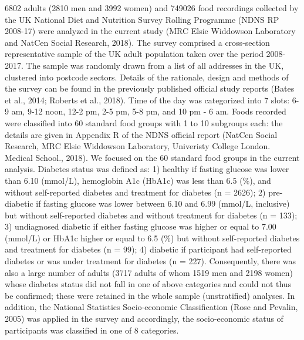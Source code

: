 \documentclass[utf8]{frontiersSCNS}
\begin{document}
6802 adults (2810 men and 3992 women) and 749026 food recordings
collected by the UK National Diet and Nutrition Survey Rolling Programme
(NDNS RP 2008-17) were analyzed in the current study (MRC Elsie
Widdowson Laboratory and NatCen Social Research, 2018). The survey
comprised a cross-section representative sample of the UK adult
population taken over the period 2008-2017. The sample was randomly
drawn from a list of all addresses in the UK, clustered into postcode
sectors. Details of the rationale, design and methods of the survey can
be found in the previously published official study reports (Bates et
al., 2014; Roberts et al., 2018). Time of the day was categorized into 7
slots: 6-9 am, 9-12 noon, 12-2 pm, 2-5 pm, 5-8 pm, and 10 pm - 6 am.
Foods recorded were classified into 60 standard food groups with 1 to 10
subgroups each: the details are given in Appendix R of the NDNS official
report (NatCen Social Research, MRC Elsie Widdowson Laboratory,
Univeristy College London. Medical School., 2018). We focused on the 60
standard food groups in the current analysis. Diabetes status was
defined as: 1) healthy if fasting glucose was lower than 6.10 (mmol/L),
hemoglobin A1c (HbA1c) was less than 6.5 (\%), and without self-reported
diabetes and treatment for diabetes (n = 2626); 2) pre-diabetic if
fasting glucose was lower between 6.10 and 6.99 (mmol/L, inclusive) but
without self-reported diabetes and without treatment for diabetes (n =
133); 3) undiagnosed diabetic if either fasting glucose was higher or
equal to 7.00 (mmol/L) or HbA1c higher or equal to 6.5 (\%) but without
self-reported diabetes and treatment for diabetes (n = 99); 4) diabetic
if participant had self-reported diabetes or was under treatment for
diabetes (n = 227). Consequently, there was also a large number of
adults (3717 adults of whom 1519 men and 2198 women) whose diabetes
status did not fall in one of above categories and could not thus be
confirmed; these were retained in the whole sample (unstratified)
analyses. In addition, the National Statistics Socio-economic
Classification (Rose and Pevalin, 2005) was applied in the survey and
accordingly, the socio-economic status of participants was classified in
one of 8 categories.
\end{document}
